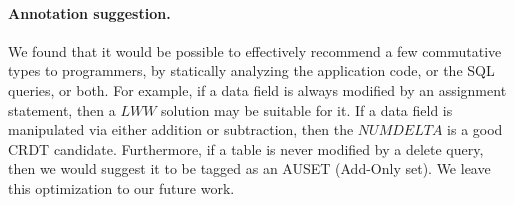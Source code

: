 \paragraph{Annotation suggestion.} We found that it would be possible to
effectively recommend a few commutative types to programmers, by statically
analyzing the application code, or the SQL queries, or both. For example, if a
data field is always modified by an assignment statement, then a $LWW$ solution
may be suitable for it. If a data field is manipulated via either addition or
subtraction, then the $NUMDELTA$ is a good CRDT candidate. Furthermore, if a table is
never modified by a delete query, then we would suggest it to be tagged as an
AUSET (Add-Only set). We leave this optimization to our future work.

